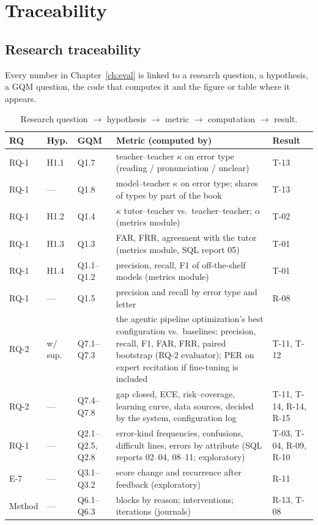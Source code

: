 \chapter{Traceability}\label{app:trace}

\section{Research traceability}

Every number in Chapter~\ref{ch:eval} is linked to a research question, a hypothesis, a GQM question, the
code that computes it and the figure or table where it appears.

\begin{table}[ht]
\centering\small
\caption{Research question $\to$ hypothesis $\to$ metric $\to$ computation $\to$ result.}
\begin{tabularx}{\linewidth}{@{}lllLl@{}}
\toprule
RQ & Hyp. & GQM & Metric (computed by) & Result \\
\midrule
RQ-1 & H1.1 & Q1.7 & teacher--teacher $\kappa$ on error type (reading / pronunciation / unclear) & T-13 \\
RQ-1 & --- & Q1.8 & model--teacher $\kappa$ on error type; shares of types by part of the book & T-13 \\
RQ-1 & H1.2 & Q1.4 & $\kappa$ tutor--teacher vs.\ teacher--teacher; $\alpha$ (metrics module) & T-02 \\
RQ-1 & H1.3 & Q1.3 & FAR, FRR, agreement with the tutor (metrics module, SQL report 05) & T-01 \\
RQ-1 & H1.4 & Q1.1--Q1.2 & precision, recall, F1 of off-the-shelf models (metrics module) & T-01 \\
RQ-1 & --- & Q1.5 & precision and recall by error type and letter & R-08 \\
RQ-2 & w/ sup. & Q7.1--Q7.3 & the agentic pipeline optimization's best configuration vs.\ baselines: precision, recall, F1, FAR, FRR, paired bootstrap (RQ-2 evaluator); PER on expert recitation if fine-tuning is included & T-11, T-12 \\
RQ-2 & --- & Q7.4--Q7.8 & gap closed, ECE, risk--coverage, learning curve, data sources, decided by the system, configuration log & T-11, T-14, R-14, R-15 \\
RQ-1 & --- & Q2.1--Q2.5, Q2.8 & error-kind frequencies, confusions, difficult lines, errors by attribute (SQL reports 02--04, 08--11; exploratory) & T-03, T-04, R-09, R-10 \\
E-7 & --- & Q3.1--Q3.2 & score change and recurrence after feedback (exploratory) & R-11 \\
Method & --- & Q6.1--Q6.3 & blocks by reason; interventions; iterations (journals) & R-13, T-08 \\
\bottomrule
\end{tabularx}
\end{table}

